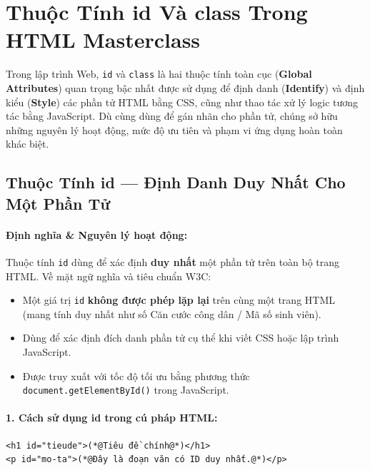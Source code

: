 \documentclass[11pt,oneside]{book}
\newcommand{\codeinline}[1]{\textcolor{accentOrange}{\texttt{#1}}}
\newcommand{\term}[1]{\textbf{\textcolor{primaryBlue}{#1}}}
\begin{document}
\Needspace*{80pt}
\section{Thuộc Tính id Và class Trong HTML Masterclass}
\label{sec:html_id_class_masterclass}

Trong lập trình Web, \codeinline{id} và \codeinline{class} là hai thuộc tính toàn cục (\term{Global Attributes}) quan trọng bậc nhất được sử dụng để định danh (\term{Identify}) và định kiểu (\term{Style}) các phần tử HTML bằng CSS, cũng như thao tác xử lý logic tương tác bằng JavaScript. Dù cùng dùng để gán nhãn cho phần tử, chúng sở hữu những nguyên lý hoạt động, mức độ ưu tiên và phạm vi ứng dụng hoàn toàn khác biệt.

\subsection{Thuộc Tính id --- Định Danh Duy Nhất Cho Một Phần Tử}

\paragraph{Định nghĩa \& Nguyên lý hoạt động:}
Thuộc tính \codeinline{id} dùng để xác định \textbf{duy nhất} một phần tử trên toàn bộ trang HTML. Về mặt ngữ nghĩa và tiêu chuẩn W3C:
\begin{itemize}[leftmargin=1.8em, itemsep=3pt, parsep=0pt]
    \item Một giá trị \codeinline{id} \textbf{không được phép lặp lại} trên cùng một trang HTML (mang tính duy nhất như số Căn cước công dân / Mã số sinh viên).
    \item Dùng để xác định đích danh phần tử cụ thể khi viết CSS hoặc lập trình JavaScript.
    \item Được truy xuất với tốc độ tối ưu bằng phương thức \codeinline{document.getElementById()} trong JavaScript.
\end{itemize}

\paragraph{1. Cách sử dụng id trong cú pháp HTML:}
\begin{codeWindow}
\begin{lstlisting}[language=HTML5]
<h1 id="tieude">(*@Tiêu đề chính@*)</h1>
<p id="mo-ta">(*@Đây là đoạn văn có ID duy nhất.@*)</p>
\end{lstlisting}
\end{codeWindow}
\end{document}
